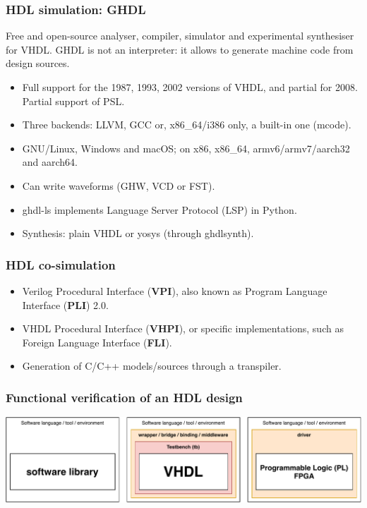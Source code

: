 \documentclass{beamer}
\begin{document}
\begin{frame}
\frametitle{HDL simulation: GHDL}
\small Free and open-source  analyser, compiler, simulator and experimental synthesiser for VHDL. GHDL is not an interpreter: it allows to generate machine code from design sources.
\vspace{1em}
\begin{itemize}
  \item Full support for the 1987, 1993, 2002 versions of VHDL, and partial for 2008. Partial support of PSL.
  \item Three backends: LLVM, GCC or, x86\_64/i386 only, a built-in one (mcode).
  \item GNU/Linux, Windows and macOS; on x86, x86\_64, armv6/armv7/aarch32 and aarch64.
  \item Can write waveforms (GHW, VCD or FST).
  \item ghdl-ls implements Language Server Protocol (LSP) in Python.
  \item Synthesis: plain VHDL or yosys (through ghdlsynth).
\end{itemize}
\end{frame}

\begin{frame}
\frametitle{HDL co-simulation}
\begin{itemize}
  \item Verilog Procedural Interface (\textbf{VPI}), also known as Program Language Interface (\textbf{PLI}) 2.0.
\end{itemize}
\vspace{1em}
\begin{itemize}
  \item VHDL Procedural Interface (\textbf{VHPI}), or specific implementations, such as Foreign Language Interface (\textbf{FLI}).
\end{itemize}
\vspace{1em}
\begin{itemize}
  \item Generation of C/C++ models/sources through a transpiler.
\end{itemize}
\end{frame}

\begin{frame}
\frametitle{Functional verification of an HDL design}
\centering
\includegraphics[width=\linewidth]{cosim.pdf}
\end{frame}
\end{document}
